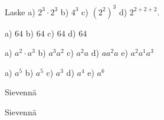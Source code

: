 \begin{tehtavasivu}
   \begin{tehtava}
        Laske
        a) $2^3\cdot2^3$
        b) $4^3$
        c) $(2^2)^3$
        d) $2^{2+2+2}$.

        \begin{vastaus}
            a) $64$
            b) $64$
            c) $64$
            d) $64$
        \end{vastaus}
    \end{tehtava}
    
    \begin{tehtava}
        a) $a^2\cdot a^3$
        b) $a^3a^2$
        c) $a^2 a$
        d) $a a^2 a$
        e) $a^2a^1a^3$
        
        \begin{vastaus}
            a) $a^5$
            b) $a^5$
            c) $a^3$ 
            d) $a^4$
            e) $a^6$
        \end{vastaus}
    \end{tehtava}

\begin{tehtava}
  		Sievennä
        \begin{alakohdatrivi}
 		\end{alakohdatrivi}
        \begin{vastaus}
        \begin{alakohdatrivi}
        \end{alakohdatrivi}
        \end{vastaus}
\end{tehtava}



\begin{tehtava}
  		Sievennä
        \begin{alakohdatrivi}
 		\end{alakohdatrivi}
        \begin{vastaus}
        \begin{alakohdatrivi}
        \end{alakohdatrivi}
        \end{vastaus}
\end{tehtava}



\end{tehtavasivu}
